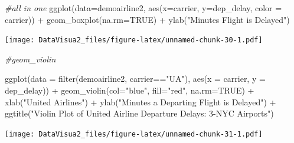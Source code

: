 \documentclass[
]{article}
\newenvironment{Shaded}{\begin{snugshade}}{\end{snugshade}}
\newcommand{\AttributeTok}[1]{\textcolor[rgb]{0.77,0.63,0.00}{#1}}
\newcommand{\CommentTok}[1]{\textcolor[rgb]{0.56,0.35,0.01}{\textit{#1}}}
\newcommand{\ConstantTok}[1]{\textcolor[rgb]{0.00,0.00,0.00}{#1}}
\newcommand{\FunctionTok}[1]{\textcolor[rgb]{0.00,0.00,0.00}{#1}}
\newcommand{\NormalTok}[1]{#1}
\newcommand{\SpecialCharTok}[1]{\textcolor[rgb]{0.00,0.00,0.00}{#1}}
\newcommand{\StringTok}[1]{\textcolor[rgb]{0.31,0.60,0.02}{#1}}
\begin{document}
\begin{Shaded}
\begin{Highlighting}[]
\CommentTok{\#all in one}
\FunctionTok{ggplot}\NormalTok{(}\AttributeTok{data=}\NormalTok{demoairline2, }\FunctionTok{aes}\NormalTok{(}\AttributeTok{x=}\NormalTok{carrier, }\AttributeTok{y=}\NormalTok{dep\_delay, }\AttributeTok{color =}\NormalTok{ carrier)) }\SpecialCharTok{+} \FunctionTok{geom\_boxplot}\NormalTok{(}\AttributeTok{na.rm=}\ConstantTok{TRUE}\NormalTok{) }\SpecialCharTok{+} \FunctionTok{ylab}\NormalTok{(}\StringTok{"Minutes Flight is Delayed"}\NormalTok{)}
\end{Highlighting}
\end{Shaded}

\texttt{[image: DataVisua2\_files/figure-latex/unnamed-chunk-30-1.pdf]}

\begin{Shaded}
\begin{Highlighting}[]
\CommentTok{\#geom\_violin}

\FunctionTok{ggplot}\NormalTok{(}\AttributeTok{data =} \FunctionTok{filter}\NormalTok{(demoairline2, carrier}\SpecialCharTok{==}\StringTok{"UA"}\NormalTok{), }\FunctionTok{aes}\NormalTok{(}\AttributeTok{x =}\NormalTok{ carrier, }\AttributeTok{y =}\NormalTok{ dep\_delay)) }\SpecialCharTok{+} \FunctionTok{geom\_violin}\NormalTok{(}\AttributeTok{col=}\StringTok{"blue"}\NormalTok{, }\AttributeTok{fill=}\StringTok{"red"}\NormalTok{, }\AttributeTok{na.rm=}\ConstantTok{TRUE}\NormalTok{) }\SpecialCharTok{+} \FunctionTok{xlab}\NormalTok{(}\StringTok{"United Airlines"}\NormalTok{) }\SpecialCharTok{+} \FunctionTok{ylab}\NormalTok{(}\StringTok{"Minutes a Departing Flight is Delayed"}\NormalTok{) }\SpecialCharTok{+} \FunctionTok{ggtitle}\NormalTok{(}\StringTok{"Violin Plot of United Airline Departure Delays: 3{-}NYC Airports"}\NormalTok{)}
\end{Highlighting}
\end{Shaded}

\texttt{[image: DataVisua2\_files/figure-latex/unnamed-chunk-31-1.pdf]}
\end{document}

